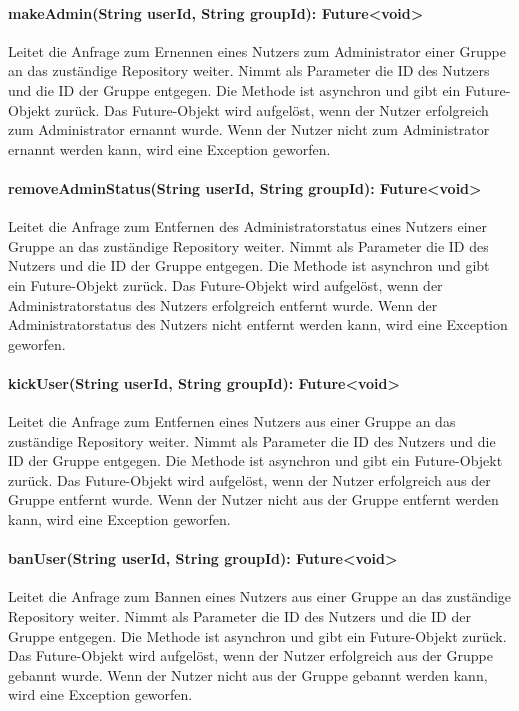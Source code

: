 \documentclass[parskip=full]{scrartcl}
\begin{document}
\paragraph{makeAdmin(String userId, String groupId): Future<void>}
Leitet die Anfrage zum Ernennen eines Nutzers zum Administrator einer Gruppe an das zuständige Repository weiter. Nimmt als Parameter die ID des Nutzers und die ID der Gruppe entgegen. Die Methode ist asynchron und gibt ein Future-Objekt zurück. Das Future-Objekt wird aufgelöst, wenn der Nutzer erfolgreich zum Administrator ernannt wurde. Wenn der Nutzer nicht zum Administrator ernannt werden kann, wird eine Exception geworfen.
\paragraph{removeAdminStatus(String userId, String groupId): Future<void>}
Leitet die Anfrage zum Entfernen des Administratorstatus eines Nutzers einer Gruppe an das zuständige Repository weiter. Nimmt als Parameter die ID des Nutzers und die ID der Gruppe entgegen. Die Methode ist asynchron und gibt ein Future-Objekt zurück. Das Future-Objekt wird aufgelöst, wenn der Administratorstatus des Nutzers erfolgreich entfernt wurde. Wenn der Administratorstatus des Nutzers nicht entfernt werden kann, wird eine Exception geworfen.
\paragraph{kickUser(String userId, String groupId): Future<void>}
Leitet die Anfrage zum Entfernen eines Nutzers aus einer Gruppe an das zuständige Repository weiter. Nimmt als Parameter die ID des Nutzers und die ID der Gruppe entgegen. Die Methode ist asynchron und gibt ein Future-Objekt zurück. Das Future-Objekt wird aufgelöst, wenn der Nutzer erfolgreich aus der Gruppe entfernt wurde. Wenn der Nutzer nicht aus der Gruppe entfernt werden kann, wird eine Exception geworfen.
\paragraph{banUser(String userId, String groupId): Future<void>}
Leitet die Anfrage zum Bannen eines Nutzers aus einer Gruppe an das zuständige Repository weiter. Nimmt als Parameter die ID des Nutzers und die ID der Gruppe entgegen. Die Methode ist asynchron und gibt ein Future-Objekt zurück. Das Future-Objekt wird aufgelöst, wenn der Nutzer erfolgreich aus der Gruppe gebannt wurde. Wenn der Nutzer nicht aus der Gruppe gebannt werden kann, wird eine Exception geworfen.
\end{document}
